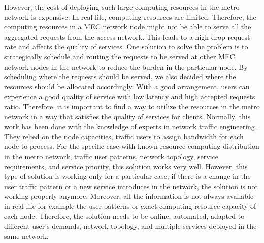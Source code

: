 \documentclass[conference]{IEEEtran}
\begin{document}
However, the cost of deploying such large computing resources in the metro network is expensive. In real life, computing resources are limited. Therefore, the computing resources in a MEC network node might not be able to serve all the aggregated requests from the access network. This leads to a high drop request rate and affects the quality of services. One solution to solve the problem is to strategically schedule and routing the requests to be served at other MEC network nodes in the network to reduce the burden in the particular node. By scheduling where the requests should be served, we also decided where the resources should be allocated accordingly. With a good arrangement, users can experience a good quality of service with low latency and high accepted requests ratio. Therefore, it is important to find a way to utilize the resources in the metro network in a way that satisfies the quality of services for clients. Normally, this work has been done with the knowledge of experts in network traffic engineering \cite{7534741}. They relied on the node capacities, traffic users to assign bandwidth for each node to process. For the specific case with known resource computing distribution in the metro network, traffic user patterns, network topology, service requirements, and service priority, this solution works very well. However, this type of solution is working only for a particular case, if there is a change in the user traffic pattern or a new service introduces in the network, the solution is not working properly anymore. Moreover, all the information is not always available in real life for example the user patterns or exact computing resource capacity of each node. Therefore, the solution needs to be online, automated, adapted to different user's demands, network topology, and multiple services deployed in the same network. 
\end{document}
